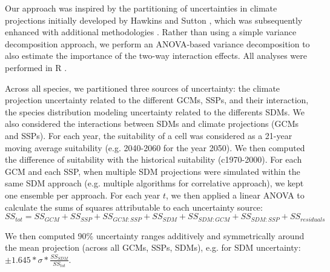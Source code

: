\documentclass[11pt,letter]{article}
\begin{document}
Our approach was inspired by the partitioning of uncertainties in climate projections initially developed by Hawkins and Sutton \citep{Hawkins2009, Hawkins2011}, which was subsequently enhanced with additional methodologies \citep{Yip2011, Lafferty2023}. Rather than using a simple variance decomposition approach, we perform an ANOVA-based variance decomposition to also estimate the importance of the two-way interaction effects. All analyses were performed in R \citep{RCT2024}.

Across all species, we partitioned three sources of uncertainty: the climate projection uncertainty related to the different GCMs, SSPs, and their interaction, the species distribution modeling uncertainty related to the differents SDMs. We also considered the interactions between SDMs and climate projections (GCMs and SSPs). For each year, the suitability of a cell was considered as a 21-year moving average suitability (e.g. 2040-2060 for the year 2050). We then computed the difference of suitability with the historical suitability (c1970-2000). For each GCM and each SSP, when multiple SDM projections were simulated within the same SDM approach (e.g. multiple algorithms for correlative approach), we kept one ensemble per approach. For each year $t$, we then applied a linear ANOVA to calculate the sums of squares attributable to each uncertainty source:
$$
{SS}_{tot} = {SS}_{GCM} + {SS}_{SSP} + {SS}_{GCM:SSP} + {SS}_{SDM} + {SS}_{SDM:GCM} + {SS}_{SDM:SSP} + {SS}_{residuals}
$$

We then computed 90\% uncertainty ranges additively and symmetrically around the mean projection (across all GCMs, SSPs, SDMs), e.g. for SDM uncertainty: $\pm1.645*\sigma*\frac{{SS}_{SDM}}{{SS}_{tot}}$.


\clearpage


\end{document}

